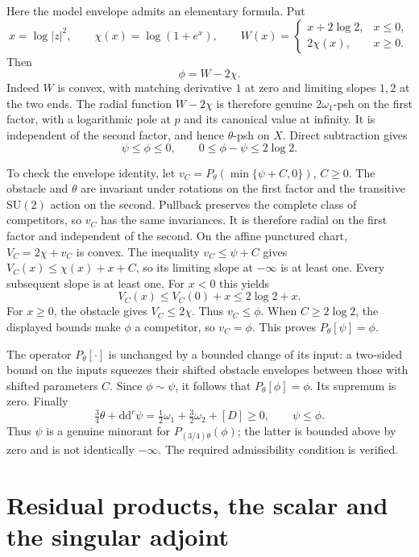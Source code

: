 \documentclass[11pt]{article}
\newcommand{\ddc}{\mathrm d\mathrm d^c}
\begin{document}
Here the model envelope admits an elementary formula. Put
\[
 x=\log|z|^2,\qquad \chi(x)=\log(1+e^x),\qquad
 W(x)=\begin{cases}
         x+2\log2,&x\le0,\\
         2\chi(x),&x\ge0.
       \end{cases}
\]
Then
\begin{equation}\label{eq:model}
 \phi=W-2\chi.
\end{equation}
Indeed $W$ is convex, with matching derivative $1$ at zero and limiting
slopes $1,2$ at the two ends. The radial function $W-2\chi$ is therefore
genuine $2\omega_1$-psh on the first factor, with a logarithmic pole at
$p$ and its canonical value at infinity. It is independent of the
second factor, and hence $\theta$-psh on $X$. Direct subtraction gives
\[
 \psi\le\phi\le0,\qquad 0\le\phi-\psi\le2\log2.
\]

To check the envelope identity, let
$v_C=P_\theta(\min\{\psi+C,0\})$, $C\ge0$. The obstacle and $\theta$
are invariant under rotations on the first factor and the transitive
$\mathrm{SU}(2)$ action on the second. Pullback preserves the complete
class of competitors, so $v_C$ has the same invariances. It is therefore
radial on the first factor and independent of the second. On the affine
punctured chart, $V_C=2\chi+v_C$ is convex. The inequality
$v_C\le\psi+C$ gives
$V_C(x)\le\chi(x)+x+C$, so its limiting slope at $-\infty$ is at
least one. Every subsequent slope is at least one. For $x<0$ this yields
\[
 V_C(x)\le V_C(0)+x\le2\log2+x.
\]
For $x\ge0$, the obstacle gives $V_C\le2\chi$. Thus $v_C\le\phi$.
When $C\ge2\log2$, the displayed bounds make $\phi$ a competitor,
so $v_C=\phi$. This proves $P_\theta[\psi]=\phi$.

The operator $P_\theta[\cdot]$ is unchanged by a bounded change of
its input: a two-sided bound on the inputs squeezes their shifted
obstacle envelopes between those with shifted parameters $C$.
Since $\phi\sim\psi$, it follows that $P_\theta[\phi]=\phi$.
Its supremum is zero. Finally
\[
 \tfrac34\theta+\ddc\psi
       =\tfrac12\omega_1+\tfrac32\omega_2+[D]\ge0,
 \qquad \psi\le\phi.
\]
Thus $\psi$ is a genuine minorant for $P_{(3/4)\theta}(\phi)$;
the latter is bounded above by zero and is not identically $-\infty$.
The required admissibility condition is verified.

\section{Residual products, the scalar and the singular adjoint}
\end{document}
